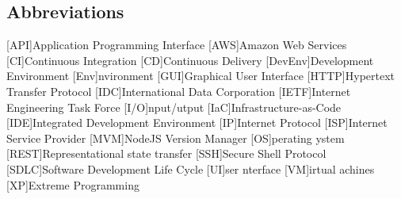 \newcommand{\abbr}{Abbreviations}
\subsection{Abbreviations}

\begin{acronym}[1234567890]		%
\setlength{\itemsep}{-\parsep}	%
[API]{Application Programming Interface}
[AWS]{Amazon Web Services}
[CI]{Continuous Integration}
[CD]{Continuous Delivery}
[DevEnv]{Development Environment}
[Env]{nvironment}
[GUI]{Graphical User Interface}
[HTTP]{Hypertext Transfer Protocol}
[IDC]{International Data Corporation}
[IETF]{Internet Engineering Task Force}
[I/O]{nput/utput}
[IaC]{Infrastructure-as-Code}
[IDE]{Integrated Development Environment }
[IP]{Internet Protocol}
[ISP]{Internet Service Provider}
[MVM]{NodeJS Version Manager}
[OS]{perating ystem}
[REST]{Representational state transfer}
[SSH]{Secure Shell Protocol}
[SDLC]{Software Development Life Cycle}
[UI]{ser nterface}
[VM]{irtual achines}
[XP]{Extreme Programming}
\end{acronym}